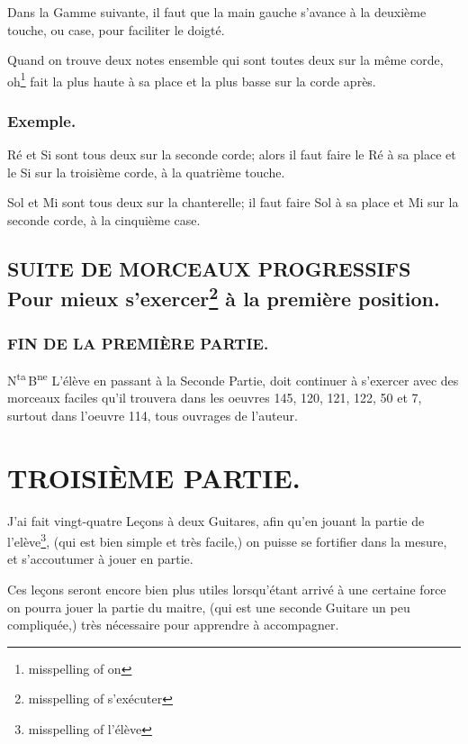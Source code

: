 \documentclass[a4paper]{book}
\begin{document}
Dans la Gamme suivante, il faut que la main gauche s'avance à la deuxième touche, ou case, pour faciliter le doigté.

Quand on trouve deux notes ensemble qui sont toutes deux sur la même corde, oh\footnote{misspelling of on} fait la plus haute à sa place et la plus basse sur la corde après.

\section*{Exemple.}

Ré et Si sont tous deux sur la seconde corde; alors il faut faire le Ré à sa place et le Si sur la troisième corde, à la quatrième touche.

Sol et Mi sont tous deux sur la chanterelle; il faut faire Sol à sa place et Mi sur la seconde corde, à la cinquième case.

\chapter[Suite de morceaux progressifs pour mieux s'exercer]{%
  SUITE DE MORCEAUX PROGRESSIFS\\
  \normalsize Pour mieux s'exercer\footnote{misspelling of s'exécuter} à la première position.}

\section*{FIN DE LA PREMIÈRE PARTIE.}

N\textsuperscript{ta}\,B\textsuperscript{ne}
L'élève en passant à la Seconde Partie, doit continuer à s'exercer avec des morceaux faciles qu'il trouvera dans les oeuvres 145, 120, 121, 122, 50 et 7, surtout dans l'oeuvre 114, tous ouvrages de l'auteur.


\part{TROISIÈME PARTIE.}

J'ai fait vingt-quatre Leçons à deux Guitares, afin qu'en jouant la partie de l'elève\footnote{misspelling of l'élève}, (qui est bien simple et très facile,) on puisse se fortifier dans la mesure, et s'accoutumer à jouer en partie.

Ces leçons seront encore bien plus utiles lorsqu'étant arrivé à une certaine force on pourra jouer la partie du maitre, (qui est une seconde Guitare un peu compliquée,) très nécessaire pour apprendre à accompagner.
\end{document}
